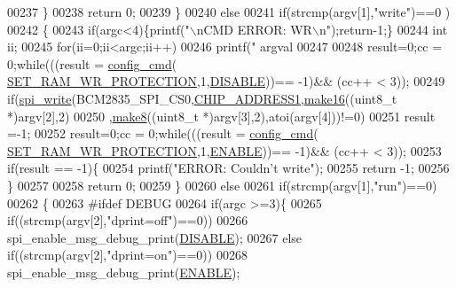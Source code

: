 \begin{DoxyCode}
{{00237         \}
00238      \textcolor{keywordflow}{return} 0;
00239      \}
00240      \textcolor{keywordflow}{else} 
00241      \textcolor{keywordflow}{if}(strcmp(argv[1],\textcolor{stringliteral}{"write"})==0 )
00242      \{
00243         \textcolor{keywordflow}{if}(argc<4)\{printf(\textcolor{stringliteral}{"\(\backslash\)nCMD ERROR: WR\(\backslash\)n"});\textcolor{keywordflow}{return}-1;\}
00244     \textcolor{keywordtype}{int} ii;
00245        \textcolor{keywordflow}{for}(ii=0;ii<argc;ii++)
00246             printf(\textcolor{stringliteral}{" argval %
00247         
00248         result=0;cc = 0;\textcolor{keywordflow}{while}(((result = \hyperlink{a00005_ga369ee0e8379941cbc2c79b90ec3292da}{config\_cmd}(
      \hyperlink{a00043_a5b534b9caab512045a6e762f3930a501}{SET\_RAM\_WR\_PROTECTION},1,\hyperlink{a00037_a99496f7308834e8b220f7894efa0b6ab}{DISABLE}))== -1)&& (cc++ < 3)); 
00249         \textcolor{keywordflow}{if}(\hyperlink{a00007_ga2770219ad8ad1eda1817c0df934b47d0}{spi\_write}(BCM2835\_SPI\_CS0,\hyperlink{a00037_a94de2b046db6e10257ef4481c0a15eaa}{CHIP\_ADDRESS1},\hyperlink{a00009_ga1e74920f34a07a82cca58eab71ed12b3}{make16}((uint8\_t *)argv[2],2)
00250         ,\hyperlink{a00009_gaefa26c3e5b22ccbe5de1c33305f20e1b}{make8}((uint8\_t *)argv[3],2),atoi(argv[4]))!=0)
00251           result =-1;
00252          result=0;cc = 0;\textcolor{keywordflow}{while}(((result = \hyperlink{a00005_ga369ee0e8379941cbc2c79b90ec3292da}{config\_cmd}(
      \hyperlink{a00043_a5b534b9caab512045a6e762f3930a501}{SET\_RAM\_WR\_PROTECTION},1,\hyperlink{a00037_a514ad415fb6125ba296793df7d1a468a}{ENABLE}))== -1)&& (cc++ < 3)); 
00253          \textcolor{keywordflow}{if}(result == -1)\{
00254                     printf(\textcolor{stringliteral}{"ERROR: Couldn't write"});  
00255                       \textcolor{keywordflow}{return} -1;
00256          \}
00257          
00258      \textcolor{keywordflow}{return} 0;
00259      \}
00260      \textcolor{keywordflow}{else}
00261      \textcolor{keywordflow}{if}(strcmp(argv[1],\textcolor{stringliteral}{"run"})==0) 
00262      \{
00263 \textcolor{preprocessor}{        #ifdef DEBUG}
00264 \textcolor{preprocessor}{}        \textcolor{keywordflow}{if}(argc >=3)\{
00265            \textcolor{keywordflow}{if}((strcmp(argv[2],\textcolor{stringliteral}{"dprint=off"})==0))
00266                spi\_enable\_msg\_debug\_print(\hyperlink{a00037_a99496f7308834e8b220f7894efa0b6ab}{DISABLE});
00267             \textcolor{keywordflow}{else} \textcolor{keywordflow}{if}((strcmp(argv[2],\textcolor{stringliteral}{"dprint=on"})==0))
00268                 spi\_enable\_msg\_debug\_print(\hyperlink{a00037_a514ad415fb6125ba296793df7d1a468a}{ENABLE});
}}}
\end{DoxyCode}
